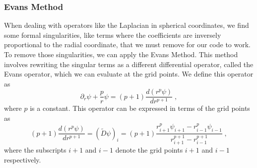 \subsubsection{Evans Method}
When dealing with operators like the Laplacian in spherical coordinates, we find some formal singularities, like terms where the coefficients are inversely proportional to the radial coordinate, that we must remove for our code to work. To remove those singularities, we can apply the Evans Method. This method involves rewriting the singular terms as a different differential operator, called the Evans operator, which we can evaluate at the grid points. We define this operator as
%
\begin{equation}
    \partial_r \psi + \frac{p}{r}\psi = (p+1) \frac{d(r^p \psi)}{dr^{p+1}}\;,
\end{equation}
%
where $p$ is a constant. This operator can be expressed in terms of the grid points as 
%
\begin{equation}
    (p+1) \frac{d(r^p \psi)}{dr^{p+1}}=(\tilde{D}\psi)_i = (p+1)\frac{r^p_{i+1}\psi_{i+1}-r^p_{i-1}\psi_{i-1}}{r^{p+1}_{i+1}-r^{p+1}_{i-1}}\;,
\end{equation}
%
where the subscripts $i+1$ and $i-1$ denote the grid points $i+1$ and $i-1$ respectively. \cite{Evans_1984}